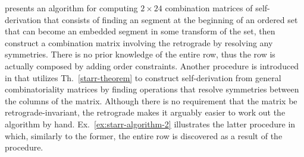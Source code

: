 \cite[217]{Starr1984} presents an algorithm for computing $2 \times 24$ combination matrices of self-derivation that consists of finding an segment at the beginning of an ordered set that can become an embedded segment in some transform of the set, then construct a combination matrix involving the retrograde by resolving any symmetries. There is no prior knowledge of the entire row, thus the row is actually composed by adding order constraints. Another procedure is introduced in \cite[222]{Starr1984} that utilizes Th.~\ref{starr-theorem} to construct self-derivation from general combinatoriality matrices by finding operations that resolve symmetries between the columns of the matrix. Although there is no requirement that the matrix be retrograde-invariant, the retrograde makes it arguably easier to work out the algorithm by hand. Ex.~\ref{ex:starr-algorithm-2} illustrates the latter procedure in which, similarly to the former, the entire row is discovered as a result of the procedure.

